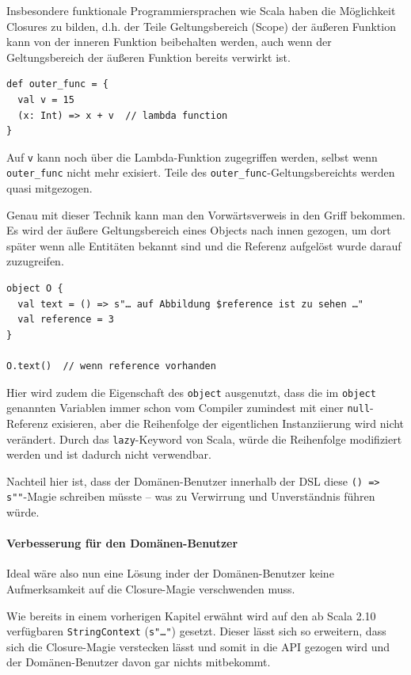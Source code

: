 Insbesondere funktionale Programmiersprachen wie Scala haben die
Möglichkeit Closures zu bilden, d.h. der Teile Geltungsbereich (Scope)
der äußeren Funktion  kann von der inneren Funktion beibehalten werden,
auch wenn der Geltungsbereich der äußeren Funktion bereits verwirkt ist.

\begin{lstlisting}
def outer_func = {
  val v = 15
  (x: Int) => x + v  // lambda function
}
\end{lstlisting}

Auf \lstinline|v| kann noch über die Lambda-Funktion zugegriffen werden,
selbst wenn \lstinline|outer_func| nicht mehr exisiert. Teile des
\lstinline|outer_func|-Geltungsbereichts werden quasi mitgezogen.

Genau mit dieser Technik kann man den Vorwärtsverweis in den Griff bekommen.
Es wird der äußere Geltungsbereich eines Objects nach innen gezogen,
um dort später wenn alle Entitäten bekannt sind und die Referenz aufgelöst
wurde darauf zuzugreifen.

\begin{lstlisting}
object O {
  val text = () => s"… auf Abbildung $reference ist zu sehen …"
  val reference = 3
}

O.text()  // wenn reference vorhanden
\end{lstlisting}

Hier wird zudem die Eigenschaft des \lstinline|object| ausgenutzt,
dass die im \lstinline|object| genannten Variablen immer schon vom Compiler
zumindest mit einer \lstinline|null|-Referenz exisieren, aber die Reihenfolge
der eigentlichen Instanziierung wird nicht verändert. Durch das
\lstinline|lazy|-Keyword von Scala, würde die Reihenfolge modifiziert werden
und ist dadurch nicht verwendbar.

Nachteil hier ist, dass der Domänen-Benutzer innerhalb der DSL diese
\lstinline|() => s""|-Magie schreiben müsste -- was zu Verwirrung und
Unverständnis führen würde.


\paragraph{Verbesserung für den Domänen-Benutzer}

Ideal wäre also nun eine Lösung inder der Domänen-Benutzer keine
Aufmerksamkeit auf die Closure-Magie verschwenden muss.

Wie bereits in einem vorherigen Kapitel %
erwähnt wird auf den ab Scala 2.10 verfügbaren
\lstinline|StringContext| (\lstinline|s"…"|) gesetzt.
Dieser lässt sich so erweitern, dass
sich die Closure-Magie verstecken lässt und somit in die API
gezogen wird und der Domänen-Benutzer davon gar nichts mitbekommt.

